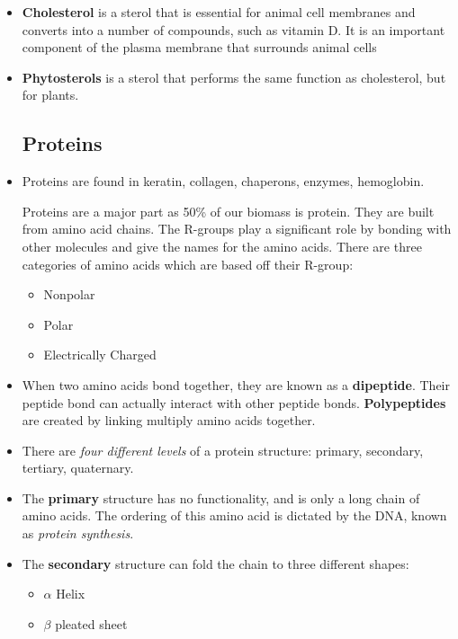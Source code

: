 \documentclass[letterpaper]{article}
\begin{document}
\begin{itemize}
    \item \textbf{Cholesterol} is a sterol that is essential for animal cell membranes and converts into a number of compounds, such as vitamin D. It is an important component of the plasma membrane that surrounds animal cells
    \item \textbf{Phytosterols} is a sterol that performs the same function as cholesterol, but for plants.
    \subsection{Proteins}
    \item Proteins are found in keratin, collagen, chaperons, enzymes, hemoglobin.
    \begin{idea}
        Proteins are a major part as 50\% of our biomass is protein. They are built from amino acid chains. The R-groups play a significant role by bonding with other molecules and give the names for the amino acids. There are three categories of amino acids which are based off their R-group:
        \begin{multicols}{3}
        \begin{itemize}
            \item Nonpolar
            \item Polar
            \item Electrically Charged
        \end{itemize}
        \end{multicols}
    \end{idea}
    \item When two amino acids bond together, they are known as a \textbf{dipeptide}. Their peptide bond can actually interact with other peptide bonds. \textbf{Polypeptides} are created by linking multiply amino acids together.
    \item There are \textit{four different levels} of a protein structure: primary, secondary, tertiary, quaternary.
    \item The \textbf{primary} structure has no functionality, and is only a long chain of amino acids. The ordering of this amino acid is dictated by the DNA, known as \textit{protein synthesis}.
    \item The \textbf{secondary} structure can fold the chain to three different shapes:
    \begin{multicols}{3}
    \begin{itemize}
        \item $\alpha$ Helix
        \item $\beta$ pleated sheet

\end{itemize}
\end{multicols}
\end{itemize}
\end{document}
